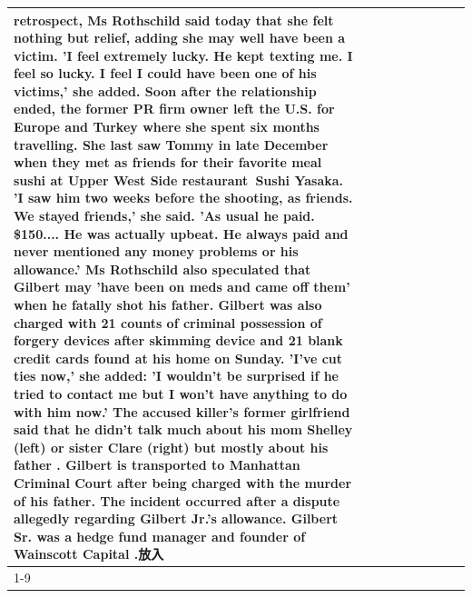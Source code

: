\begin{table}[H]
\begin{tabular}{lllrlllll}
retrospect, Ms Rothschild said today that she felt nothing but relief, adding she may well have been a victim. 'I feel extremely lucky. He kept texting me. I feel so lucky. I feel I could have been one of his victims,' she added. Soon after the relationship ended, the former PR firm owner left the U.S. for Europe and Turkey where she spent six months  travelling. She last saw Tommy in late December when they met as friends for their favorite meal sushi at Upper West Side restaurant Sushi Yasaka. 'I saw him two weeks before the shooting, as friends. We stayed friends,' she said. 'As usual he paid. \$150.... He was actually upbeat. He always paid and never mentioned any money problems or his allowance.' Ms Rothschild also speculated that Gilbert may 'have been on meds and came off them' when he fatally shot his father. Gilbert was also charged with 21 counts of criminal possession of forgery devices after skimming device and 21 blank credit cards found at his home on Sunday. 'I've cut ties now,' she added: 'I wouldn’t be surprised if he tried to contact me but I won’t have anything to do with him now.' The accused killer's former girlfriend said that he didn't talk much about his mom Shelley (left) or sister Clare (right) but mostly about his father . Gilbert is transported to Manhattan Criminal Court  after being charged with the murder of his father. The incident occurred after a dispute allegedly regarding Gilbert Jr.'s allowance. Gilbert Sr. was a hedge fund manager and founder of Wainscott Capital .放入 \\
\cline{1-9}

\end{tabular}
\end{table}

